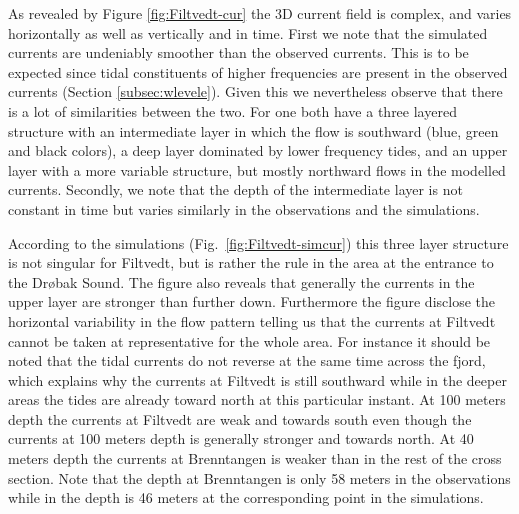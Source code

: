 As revealed by Figure \ref{fig:Filtvedt-cur} the 3D current field is complex, and varies horizontally as well as vertically and in time. First we note that the simulated currents are undeniably smoother than the observed currents. This is to be expected since tidal constituents of higher frequencies are present in the observed currents (Section \ref{subsec:wlevele}). Given this we nevertheless observe that there is a lot of similarities between the two. For one both have a three layered structure with an intermediate layer in which the flow is southward (blue, green and black colors), a deep layer dominated by lower frequency tides, and an upper layer with a more variable structure, but mostly northward flows in the modelled currents. Secondly, we note that the depth of the intermediate layer is not constant in time but varies similarly in the observations and the simulations.  

According to the simulations (Fig.~\ref{fig:Filtvedt-simcur}) this three layer structure is not singular for Filtvedt, but is rather the rule in the area at the entrance to the Dr{\o}bak Sound. The figure also reveals that generally the currents in the upper layer are stronger than further down. Furthermore the figure disclose the horizontal variability in the flow pattern telling us that the currents at Filtvedt cannot be taken at representative for the whole area. For instance it should be noted that the tidal currents do not reverse at the same time across the fjord, which explains why the currents at Filtvedt is still southward while in the deeper areas the tides are already toward north at this particular instant. At 100 meters depth the currents at Filtvedt are weak and towards south even though the currents at 100 meters depth is generally stronger and towards north. At 40 meters depth the currents at Brenntangen is weaker than in the rest of the cross section. Note that the depth at Brenntangen is only 58 meters in the observations while in the depth is 46 meters at the corresponding point in the simulations. 

